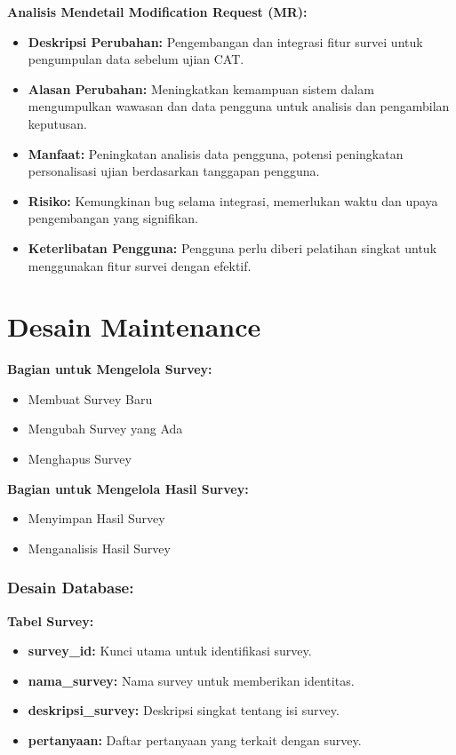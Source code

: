 \documentclass[12pt]{article}
\begin{document}
\textbf{Analisis Mendetail Modification Request (MR):}
\begin{itemize}
  \item \textbf{Deskripsi Perubahan:} Pengembangan dan integrasi fitur survei untuk pengumpulan data sebelum ujian CAT.
  \item \textbf{Alasan Perubahan:} Meningkatkan kemampuan sistem dalam mengumpulkan wawasan dan data pengguna untuk analisis dan pengambilan keputusan.
  \item \textbf{Manfaat:} Peningkatan analisis data pengguna, potensi peningkatan personalisasi ujian berdasarkan tanggapan pengguna.
  \item \textbf{Risiko:} Kemungkinan bug selama integrasi, memerlukan waktu dan upaya pengembangan yang signifikan.
  \item \textbf{Keterlibatan Pengguna:} Pengguna perlu diberi pelatihan singkat untuk menggunakan fitur survei dengan efektif.
\end{itemize}

\section*{Desain Maintenance}

\textbf{Bagian untuk Mengelola Survey:}
\begin{itemize}
  \item Membuat Survey Baru
  \item Mengubah Survey yang Ada
  \item Menghapus Survey
\end{itemize}

\textbf{Bagian untuk Mengelola Hasil Survey:}
\begin{itemize}
  \item Menyimpan Hasil Survey
  \item Menganalisis Hasil Survey
\end{itemize}

\subsubsection*{Desain Database:}

\textbf{Tabel Survey:}
\begin{itemize}
  \item \textbf{survey\_id:} Kunci utama untuk identifikasi survey.
  \item \textbf{nama\_survey:} Nama survey untuk memberikan identitas.
  \item \textbf{deskripsi\_survey:} Deskripsi singkat tentang isi survey.
  \item \textbf{pertanyaan:} Daftar pertanyaan yang terkait dengan survey.
\end{itemize}
\end{document}
